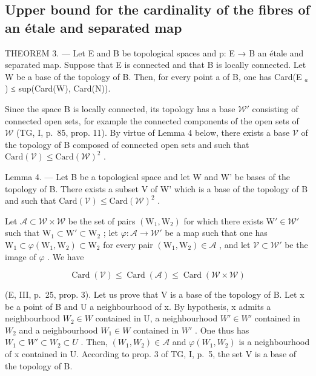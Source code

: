\subsection{Upper bound for the cardinality of the fibres of an étale and separated map}

THEOREM 3. --- Let E and B be topological spaces and p: E → B an étale and separated map. Suppose that E is connected and that B is locally connected. Let W be a base of the topology of B. Then, for every point a of B, one has Card(E \(_{a}\) ) ≤ sup(Card(W), Card(N)).

Since the space B is locally connected, its topology has a base \(\mathcal{W}'\) consisting of connected open sets, for example the connected components of the open sets of \(\mathcal{W}\) (TG, I, p.~85, prop. 11). By virtue of Lemma 4 below, there exists a base \(\mathcal{V}\) of the topology of B composed of connected open sets and such that \(\mathrm{Card}(\mathcal{V}) \leqslant \mathrm{Card}(\mathcal{W})^2\) .

Lemma 4. --- Let B be a topological space and let W and W' be bases of the topology of B. There exists a subset V of W' which is a base of the topology of B and such that \(\text{Card}(\mathcal{V}) \leqslant \text{Card}(\mathcal{W})^{2}\) .

Let \(\mathcal{A} \subset \mathcal{W} \times \mathcal{W}\) be the set of pairs \((\mathrm{W}_1, \mathrm{W}_2)\) for which there exists \(\mathrm{W}' \in \mathcal{W}'\) such that \(\mathrm{W}_1 \subset \mathrm{W}' \subset \mathrm{W}_2\) ; let \(\varphi: \mathcal{A} \to \mathcal{W}'\) be a map such that one has \(\mathrm{W}_1 \subset \varphi(\mathrm{W}_1, \mathrm{W}_2) \subset \mathrm{W}_2\) for every pair \((\mathrm{W}_1, \mathrm{W}_2) \in \mathcal{A}\) , and let \(\mathcal{V} \subset \mathcal{W}'\) be the image of \(\varphi\) . We have

\[
\operatorname{Card} (\mathcal {V}) \leqslant \operatorname{Card} (\mathcal {A}) \leqslant \operatorname{Card} (\mathcal {W} \times \mathcal {W})
\]

(E, III, p.~25, prop. 3). Let us prove that V is a base of the topology of B. Let x be a point of B and U a neighbourhood of x. By hypothesis, x admits a neighbourhood \(W_{2} \in W\) contained in U, a neighbourhood \(W' \in W'\) contained in \(W_{2}\) and a neighbourhood \(W_{1} \in W\) contained in \(W'\) . One thus has \(W_{1} \subset W' \subset W_{2} \subset U\) . Then, \((W_{1}, W_{2}) \in \mathscr{A}\) and \(\varphi(W_{1}, W_{2})\) is a neighbourhood of x contained in U. According to prop. 3 of TG, I, p.~5, the set V is a base of the topology of B.


